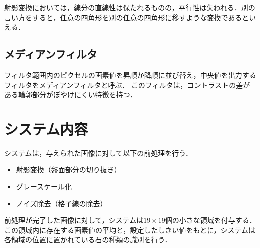 \documentclass[summary]{nitocs}
\numberwithin{equation}{section}
\begin{document}
            射影変換においては，線分の直線性は保たれるものの，平行性は失われる．別の言い方をすると，任意の四角形を別の任意の四角形に移すような変換であるといえる．

        \subsection{メディアンフィルタ}
            フィルタ範囲内のピクセルの画素値を昇順か降順に並び替え，中央値を出力するフィルタをメディアンフィルタと呼ぶ\cite{DIP}．
            このフィルタは，コントラストの差がある輪郭部分がぼやけにくい特徴を持つ．


    \section{システム内容} \label{system}
        システムは，与えられた画像に対して以下の前処理を行う．
        \begin{itemize}
            \item 射影変換（盤面部分の切り抜き）
            \item グレースケール化
            \item ノイズ除去（格子線の除去）
        \end{itemize}
        前処理が完了した画像に対して，システムは$19\times19$個の小さな領域を付与する．
        この領域内に存在する画素値の平均と，設定したしきい値をもとに，システムは各領域の位置に置かれている石の種類の識別を行う．
\end{document}
